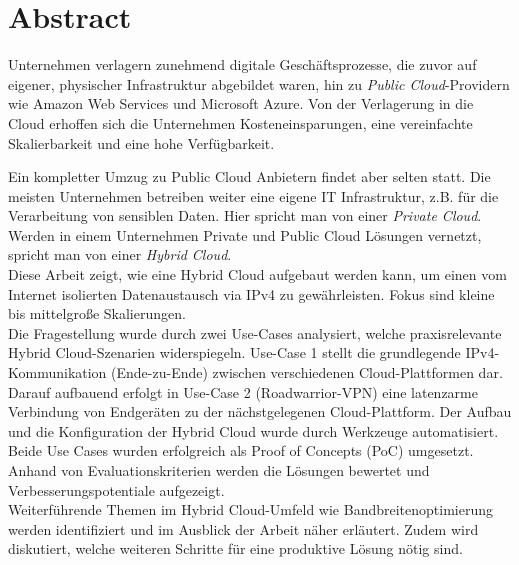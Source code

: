 \chapter{Abstract}
Unternehmen verlagern zunehmend digitale Geschäftsprozesse, die zuvor auf eigener, physischer Infrastruktur abgebildet waren, hin zu \textit{Public Cloud}-Providern wie Amazon Web Services und Microsoft Azure. Von der Verlagerung in die Cloud erhoffen sich die Unternehmen Kosteneinsparungen, eine vereinfachte Skalierbarkeit und eine hohe Verfügbarkeit.

Ein kompletter Umzug zu Public Cloud Anbietern findet aber selten statt. Die meisten Unternehmen betreiben weiter eine eigene IT Infrastruktur, z.B. für die Verarbeitung von sensiblen Daten. 
Hier spricht man von einer \textit{Private Cloud}. Werden in einem Unternehmen Private und Public Cloud Lösungen vernetzt, spricht man von einer \textit{Hybrid Cloud}. \\
Diese Arbeit zeigt, wie eine Hybrid Cloud aufgebaut werden kann, um einen vom Internet isolierten Datenaustausch via IPv4 zu gewährleisten. Fokus sind kleine bis mittelgroße Skalierungen. \\
Die Fragestellung wurde durch zwei Use-Cases analysiert, welche praxisrelevante Hybrid Cloud-Szenarien widerspiegeln. Use-Case 1 stellt die grundlegende IPv4-Kommunikation (\glqq Ende-zu-Ende\grqq{}) zwischen verschiedenen Cloud-Plattformen dar. Darauf aufbauend erfolgt in Use-Case 2 (\glqq Roadwarrior-VPN\grqq{}) eine latenzarme Verbindung von Endgeräten zu der nächstgelegenen Cloud-Plattform. Der Aufbau und die Konfiguration der Hybrid Cloud wurde durch Werkzeuge automatisiert.\\
Beide Use Cases wurden erfolgreich als Proof of Concepts (PoC) umgesetzt. Anhand von Evaluationskriterien werden die Lösungen bewertet und Verbesserungspotentiale aufgezeigt.\\
Weiterführende Themen im Hybrid Cloud-Umfeld wie Bandbreitenoptimierung werden identifiziert und im Ausblick der Arbeit näher erläutert. Zudem wird diskutiert, welche weiteren Schritte für eine produktive Lösung nötig sind.\\